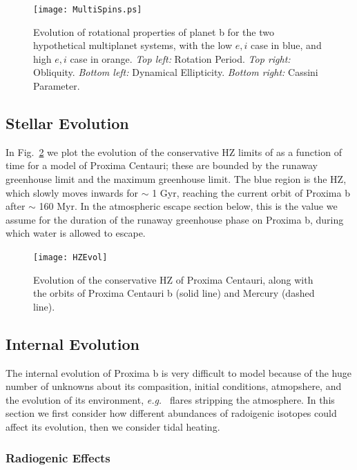\documentclass[preprint,12pt]{aastex}
\def\eg{{\it e.g.\ }}
\begin{document}
\begin{figure} 
\begin{center}
\texttt{[image: MultiSpins.ps]}
\end{center}
\caption{Evolution of rotational properties of planet b for the two
  hypothetical multiplanet systems, with the low $e,i$ case in blue,
  and high $e,i$ case in orange. {\it Top left:} Rotation Period. {\it
    Top right:} Obliquity. {\it Bottom left:} Dynamical
  Ellipticity. {\it Bottom right:} Cassini Parameter.}
\label{fig:MultiSpins}
\end{figure}

\subsection{Stellar Evolution}
\label{sec:results:stellar}

In Fig.~\ref{fig:HZEvol} we plot the evolution of the conservative HZ
limits of \cite{Kopparapu13} as a function of time for a model of
Proxima Centauri; these are bounded by the runaway greenhouse limit
and the maximum greenhouse limit. The blue region is the HZ, which
slowly moves inwards for $\sim$ 1 Gyr, reaching the current orbit of
Proxima b after $\sim$ 160 Myr. In the atmospheric escape section
below, this is the value we assume for the duration of the runaway
greenhouse phase on Proxima b, during which water is allowed to
escape.

\begin{figure}[ht]
\centering
\texttt{[image: HZEvol]}
\caption{Evolution of the conservative HZ of Proxima Centauri, along with the orbits of Proxima Centauri b (solid line) and Mercury (dashed line).}
\label{fig:HZEvol}
\end{figure}

\subsection{Internal Evolution}
\label{sec:results:internal}

The internal evolution of Proxima b is very difficult to model because
of the huge number of unknowns about its compasition, initial
conditions, atmopshere, and the evolution of its environment, \eg
flares stripping the atmosphere. In this section we first consider how
different abundances of radoigenic isotopes could affect its
evolution, then we consider tidal heating.


\subsubsection{Radiogenic Effects}
\label{sec:results:internal:radiog}
\end{document}
